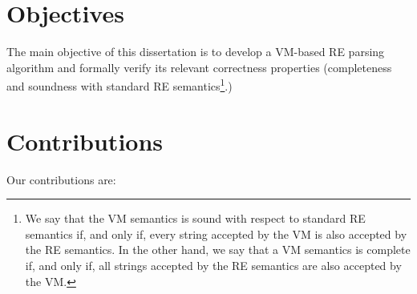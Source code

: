 \documentclass[oneside,12pt]{scrbook}
\theoremstyle{definition}
\theoremstyle{plain}
\theoremstyle{definition}
\begin{document}
\section{Objectives}\label{section:objectives}

The main objective of this dissertation is to develop a VM-based RE parsing algorithm and formally verify its relevant correctness properties (completeness and soundness with standard RE semantics\footnote{We say that the VM semantics is sound with respect to standard RE semantics if, and only if, every string accepted by the VM is also accepted by the RE semantics. In the other hand, we say that a VM semantics is complete if, and only if, all strings accepted by the RE semantics are also accepted by the VM.}.) %

\section{Contributions}\label{section:contributions}
Our contributions are:
\end{document}
